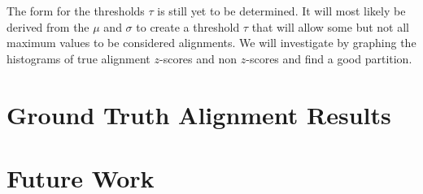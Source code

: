 \documentclass[twoside,twocolumn]{article}
\begin{document}
The form for the thresholds $\tau$ is still yet to be determined. It will most
likely be derived from the $\mu$ and $\sigma$ to create a threshold $\tau$ that
will allow some but not all maximum values to be considered alignments. We will
investigate by graphing the histograms of true alignment $z$-scores and non $z$-scores and find a good partition. 

\section{Ground Truth Alignment Results}

\section{Future Work}





\end{document}
